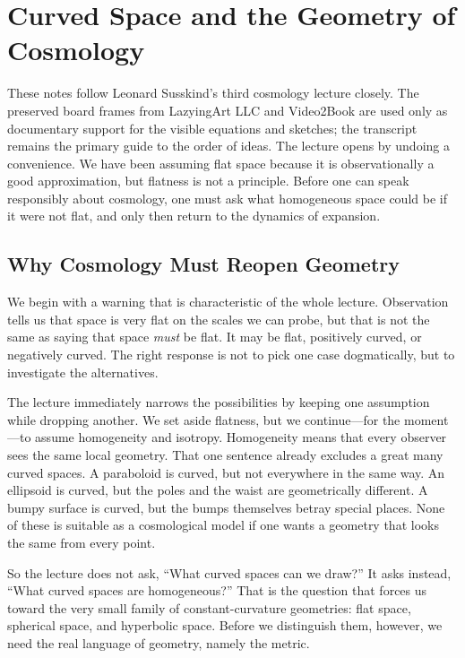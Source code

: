 \chapter{Curved Space and the Geometry of Cosmology}

These notes follow Leonard Susskind's third cosmology lecture closely. The preserved board frames from LazyingArt LLC and Video2Book are used only as documentary support for the visible equations and sketches; the transcript remains the primary guide to the order of ideas. The lecture opens by undoing a convenience. We have been assuming flat space because it is observationally a good approximation, but flatness is not a principle. Before one can speak responsibly about cosmology, one must ask what homogeneous space could be if it were not flat, and only then return to the dynamics of expansion.

\section{Why Cosmology Must Reopen Geometry}

We begin with a warning that is characteristic of the whole lecture. Observation tells us that space is very flat on the scales we can probe, but that is not the same as saying that space \emph{must} be flat. It may be flat, positively curved, or negatively curved. The right response is not to pick one case dogmatically, but to investigate the alternatives.

The lecture immediately narrows the possibilities by keeping one assumption while dropping another. We set aside flatness, but we continue---for the moment---to assume homogeneity and isotropy. Homogeneity means that every observer sees the same local geometry. That one sentence already excludes a great many curved spaces. A paraboloid is curved, but not everywhere in the same way. An ellipsoid is curved, but the poles and the waist are geometrically different. A bumpy surface is curved, but the bumps themselves betray special places. None of these is suitable as a cosmological model if one wants a geometry that looks the same from every point.

So the lecture does not ask, ``What curved spaces can we draw?'' It asks instead, ``What curved spaces are homogeneous?'' That is the question that forces us toward the very small family of constant-curvature geometries: flat space, spherical space, and hyperbolic space. Before we distinguish them, however, we need the real language of geometry, namely the metric.

